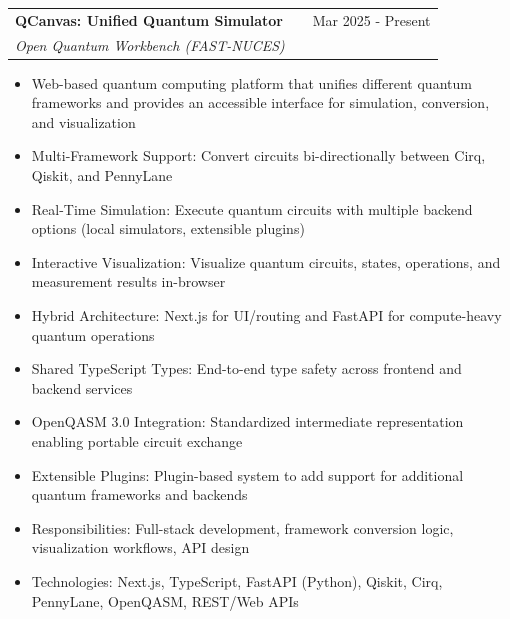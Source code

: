 \documentclass[a4paper,12pt]{article}
\makeatletter
\newenvironment{projectdetailed}[3]
    {
    \begin{tabularx}{\linewidth}{@{}l X r@{}}
    \textbf{#1} & \hfill & #2 \\
    \textit{#3} & & \\[3.75pt]
    \end{tabularx}
    \begin{minipage}[t]{\linewidth}
    \begin{itemize}[nosep,after=\strut, leftmargin=1em, itemsep=2pt,label=--]
    }
    {
    \end{itemize}
    \end{minipage}
    \vspace{6pt}
    }
\makeatother
\begin{document}
\begin{projectdetailed}{QCanvas: Unified Quantum Simulator}{Mar 2025 - Present}{Open Quantum Workbench (FAST-NUCES)}
\item Web-based quantum computing platform that unifies different quantum frameworks and provides an accessible interface for simulation, conversion, and visualization
\item Multi-Framework Support: Convert circuits bi-directionally between Cirq, Qiskit, and PennyLane
\item Real-Time Simulation: Execute quantum circuits with multiple backend options (local simulators, extensible plugins)
\item Interactive Visualization: Visualize quantum circuits, states, operations, and measurement results in-browser
\item Hybrid Architecture: Next.js for UI/routing and FastAPI for compute-heavy quantum operations
\item Shared TypeScript Types: End-to-end type safety across frontend and backend services
\item OpenQASM 3.0 Integration: Standardized intermediate representation enabling portable circuit exchange
\item Extensible Plugins: Plugin-based system to add support for additional quantum frameworks and backends
\item Responsibilities: Full-stack development, framework conversion logic, visualization workflows, API design
\item Technologies: Next.js, TypeScript, FastAPI (Python), Qiskit, Cirq, PennyLane, OpenQASM, REST/Web APIs
\end{projectdetailed}
\end{document}
